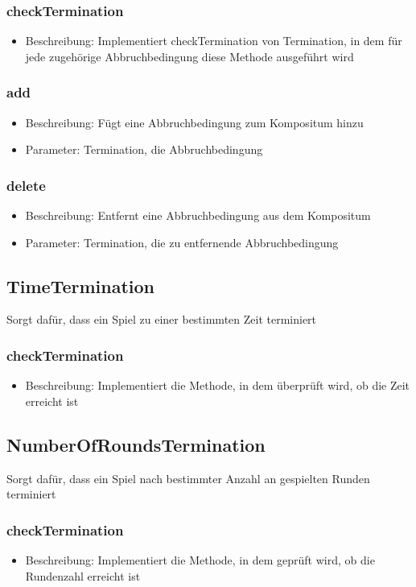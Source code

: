 \documentclass[a4paper]{scrreprt}
\begin{document}
	\subsubsection{checkTermination}
	\begin{itemize}
		\item Beschreibung: Implementiert checkTermination von Termination, in dem für jede zugehörige Abbruchbedingung diese Methode ausgeführt wird
	\end{itemize}
	\subsubsection{add}
	\begin{itemize}
		\item Beschreibung: Fügt eine Abbruchbedingung zum Kompositum hinzu
		\item Parameter: Termination, die Abbruchbedingung
	\end{itemize}
	\subsubsection{delete}
	\begin{itemize}
		\item Beschreibung: Entfernt eine Abbruchbedingung aus dem Kompositum
		\item Parameter: Termination, die zu entfernende Abbruchbedingung
	\end{itemize}
	
	
	\subsection{TimeTermination}
	Sorgt dafür, dass ein Spiel zu einer bestimmten Zeit terminiert
	\subsubsection{checkTermination}
	\begin{itemize}
		\item Beschreibung: Implementiert die Methode, in dem überprüft wird, ob die Zeit erreicht ist
	\end{itemize}
	
	\subsection{NumberOfRoundsTermination}
	Sorgt dafür, dass ein Spiel nach bestimmter Anzahl an gespielten Runden terminiert
	\subsubsection{checkTermination}
	\begin{itemize}
		\item Beschreibung: Implementiert die Methode, in dem geprüft wird, ob die Rundenzahl erreicht ist
	\end{itemize}
	
\end{document}
